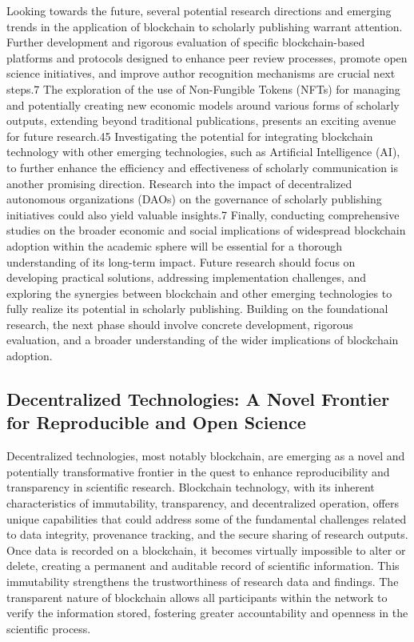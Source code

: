 Looking towards the future, several potential research directions and emerging trends in the application of blockchain to scholarly publishing warrant attention. Further development and rigorous evaluation of specific blockchain-based platforms and protocols designed to enhance peer review processes, promote open science initiatives, and improve author recognition mechanisms are crucial next steps.7 The exploration of the use of Non-Fungible Tokens (NFTs) for managing and potentially creating new economic models around various forms of scholarly outputs, extending beyond traditional publications, presents an exciting avenue for future research.45 Investigating the potential for integrating blockchain technology with other emerging technologies, such as Artificial Intelligence (AI), to further enhance the efficiency and effectiveness of scholarly communication is another promising direction. Research into the impact of decentralized autonomous organizations (DAOs) on the governance of scholarly publishing initiatives could also yield valuable insights.7 Finally, conducting comprehensive studies on the broader economic and social implications of widespread blockchain adoption within the academic sphere will be essential for a thorough understanding of its long-term impact. Future research should focus on developing practical solutions, addressing implementation challenges, and exploring the synergies between blockchain and other emerging technologies to fully realize its potential in scholarly publishing. Building on the foundational research, the next phase should involve concrete development, rigorous evaluation, and a broader understanding of the wider implications of blockchain adoption.





\subsection{Decentralized Technologies: A Novel Frontier for Reproducible and Open Science}

Decentralized technologies, most notably blockchain, are emerging as a novel and potentially transformative frontier in the quest to enhance reproducibility and transparency in scientific research. Blockchain technology, with its inherent characteristics of immutability, transparency, and decentralized operation, offers unique capabilities that could address some of the fundamental challenges related to data integrity, provenance tracking, and the secure sharing of research outputs. Once data is recorded on a blockchain, it becomes virtually impossible to alter or delete, creating a permanent and auditable record of scientific information. This immutability strengthens the trustworthiness of research data and findings. The transparent nature of blockchain allows all participants within the network to verify the information stored, fostering greater accountability and openness in the scientific process.

